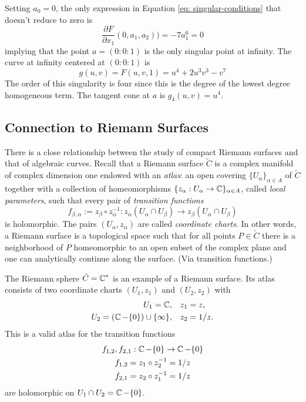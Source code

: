 \begin{example}
Setting $a_0 = 0$, the only expression in Equation \eqref{eq:
  singular-conditions} that doesn't reduce to zero is
\[
    \frac{\partial F}{\partial x_1}(0,a_1,a_2))
    =
    - 7 a_{1}^{6} = 0
\]
implying that the point $a = (0 : 0 : 1)$ is the only singular point at
infinity. The curve at infinity centered at $(0 : 0 : 1)$ is
\[
    g(u,v) = F(u,v,1) = u^{4} + 2 u^{3} v^{3} - v^{7}
\]
The order of this singularity is four since this is the degree of the
lowest degree homogeneous term. The tangent cone at $a$ is $g_4(u,v) =
u^4$.
\end{example}


\subsection{Connection to Riemann Surfaces}

There is a close relationship between the study of compact Riemann
surfaces and that of algebraic curves. Recall that a Riemann surface
$\tilde{C}$ is a complex manifold of complex dimension one endowed with
an {\it atlas}: an open covering $\{U_\alpha \}_{\alpha \in A}$ of
$\tilde{C}$ together with a collection of homeomorphisms $\{z_\alpha :
U_\alpha \to \operatorname{\mathbb{C}}\}_{\alpha \in A}$, called {\it local parameters}, such
that every pair of {\it transition functions}
\[
    f_{\beta,\alpha} := z_\beta \circ z_\alpha^{-1} :
    z_\alpha \left( U_\alpha \cap U_\beta \right)
    \to
    z_\beta \left( U_\alpha \cap U_\beta \right)
\]
is holomorphic. The pairs $(U_\alpha, z_\alpha)$ are called {\it
  coordinate charts}. In other words, a Riemann surface is a topological
space such that for all points $P \in \tilde{C}$ there is a neighborhood
of $P$ homeomorphic to an open subset of the complex plane and one can
analytically continue along the surface. (Via transition functions.)

The Riemann sphere $\tilde{C} = \operatorname{\mathbb{C}}^*$ is an example of a Riemann
surface. Its atlas consists of two coordinate charts $(U_1, z_1)$ and
$(U_2, z_2)$ with
\begin{align*}
    U_1 = \operatorname{\mathbb{C}}, & \quad z_1 = z, \\
    U_2 = \left( \operatorname{\mathbb{C}} - \{0\} \right) \cup \{ \infty \}, & \quad z_2 = 1/z.
\end{align*}
This is a valid atlas for the transition functions
\begin{gather*}
    f_{1,2}, f_{2,1} : \operatorname{\mathbb{C}} - \{0\} \to \operatorname{\mathbb{C}} - \{0\} \\
    f_{1,2} = z_1 \circ z_2^{-1} = 1/z \\
    f_{2,1} = z_2 \circ z_1^{-1} = 1/z
\end{gather*}
are holomorphic on $U_1 \cap U_2 = \operatorname{\mathbb{C}} - \{0\}$.

